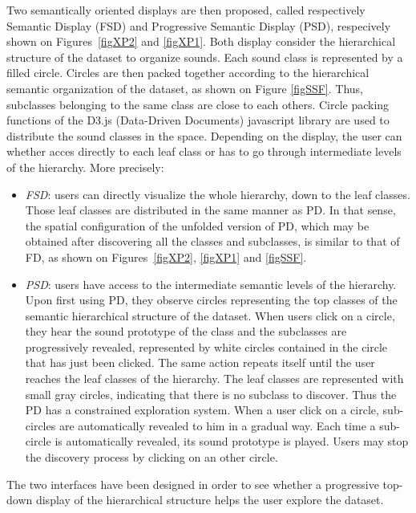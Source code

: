 \documentclass{aes2e}
\begin{document}
Two semantically oriented displays are then proposed, called respectively Semantic Display (FSD) and Progressive Semantic Display (PSD), respecively shown on Figures~\ref{figXP2} and \ref{figXP1}. Both display  consider the hierarchical structure of the dataset to organize sounds. Each sound class is represented by a filled circle. Circles are then packed together according to the hierarchical semantic organization of the dataset, as shown on Figure \ref{figSSF}. Thus, subclasses belonging to the same class are close to each others. Circle packing functions of the D3.js (Data-Driven Documents) javascript library \cite{2011-d3} are used to distribute the sound classes in the space. Depending on the display, the user can whether acces directly to each leaf class or has to go through intermediate levels of the hierarchy. More precisely: \\
\begin{itemize}
\item \textit{FSD}: users can directly visualize the whole hierarchy, down to the leaf classes. Those leaf classes are distributed  in the same manner as PD. In that sense, the spatial configuration of the unfolded version of PD, which may be obtained after discovering all the classes and subclasses, is similar to that of  FD, as shown on Figures~\ref{figXP2}, \ref{figXP1} and \ref{figSSF}.
\item \textit{PSD}: users have access to the intermediate semantic levels of the hierarchy. Upon first using PD, they observe circles representing the top classes of the semantic hierarchical structure of the dataset. When users click on a circle, they hear the sound prototype of the class and the subclasses are progressively revealed, represented by white circles contained in the circle that has just been clicked. The same action repeats itself until the user reaches the leaf classes of the hierarchy. The leaf classes are represented with small gray circles, indicating that there is no subclass to discover. Thus the PD has a constrained exploration system. When a user click on a circle, sub-circles are  automatically revealed to him in a gradual way. Each time a sub-circle is automatically revealed, its sound prototype is played. Users may stop the discovery process by clicking on an other circle. 
\end{itemize}

The two interfaces have been designed in order to see whether a progressive top-down display of the hierarchical structure helps the user explore the dataset.
\end{document}
